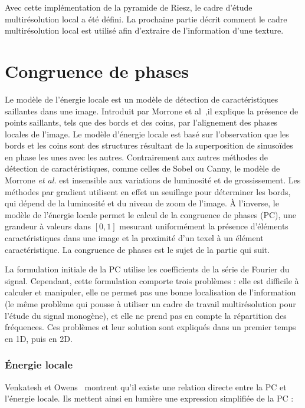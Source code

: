 Avec cette implémentation de la pyramide de Riesz, le cadre d'étude multirésolution local a été défini. La prochaine partie décrit comment le cadre multirésolution local est utilisé afin d'extraire de l'information d'une texture.

\section{Congruence de phases}

Le modèle de l'énergie locale est un modèle de détection de caractéristiques saillantes dans une image. Introduit par Morrone et al~\cite{morrone_mach_1986, morrone_feature_1987},il explique la présence de points saillants, tels que des bords et des coins, par l'alignement des phases locales de l'image. Le modèle d'énergie locale est basé sur l'observation que les bords et les coins sont des structures résultant de la superposition de sinusoïdes en phase les unes avec les autres. Contrairement aux autres méthodes de détection de caractéristiques, comme celles de Sobel ou Canny, le modèle de Morrone \textit{et al.} est insensible aux variations de luminosité et de grossissement. Les méthodes par gradient utilisent en effet un seuillage pour déterminer les bords, qui dépend de la luminosité et du niveau de zoom de l'image. À l'inverse, le modèle de l'énergie locale permet le calcul de la \og congruence de phases \fg (PC), une grandeur à valeurs dans $[0, 1]$ mesurant uniformément la présence d'éléments caractéristiques dans une image et la proximité d'un texel à un élément caractéristique. La congruence de phases est le sujet de la partie qui suit.

\bigskip

La formulation initiale de la PC utilise les coefficients de la série de Fourier du signal. Cependant, cette formulation comporte trois problèmes : elle est difficile à calculer et manipuler, elle ne permet pas une bonne localisation de l'information (le même problème qui pousse à utiliser un cadre de travail multirésolution pour l'étude du signal monogène), et elle ne prend pas en compte la répartition des fréquences. Ces problèmes et leur solution sont expliqués dans un premier temps en 1D, puis en 2D.

\subsubsection{Énergie locale}

Venkatesh et Owens~\cite{venkatesh_energy_1989} montrent qu'il existe une relation directe entre la PC et l'énergie locale. Ils mettent ainsi en lumière une expression simplifiée de la PC :

